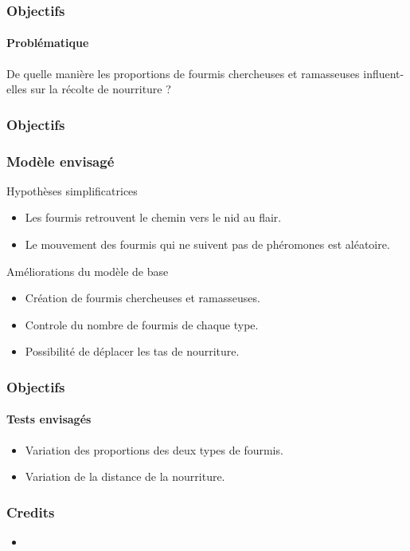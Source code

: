 \documentclass[11pt]{beamer}
\begin{document}
\begin{frame}
\frametitle{Objectifs}
\framesubtitle{Problématique}
\begin{center} De quelle manière les proportions de fourmis chercheuses et ramasseuses influent-elles sur la récolte de nourriture ?
\end{center}
\end{frame}

\begin{frame}

\frametitle{Objectifs}
\frametitle{Modèle envisagé}
\begin{block}{Hypothèses simplificatrices}
\begin{itemize}
\item Les fourmis retrouvent le chemin vers le nid au flair.
\item Le mouvement des fourmis qui ne suivent pas de phéromones est aléatoire.
\end{itemize}
\end{block}
\begin{block}{Améliorations du modèle de base}
\begin{itemize}
\item Création de fourmis chercheuses et ramasseuses.
\item Controle du nombre de fourmis de chaque type.
\item Possibilité de déplacer les tas de nourriture.
\end{itemize}
\end{block}
\end{frame}

\begin{frame}
\frametitle{Objectifs}
\framesubtitle{Tests envisagés}
\begin{itemize}
\item Variation des proportions des deux types de fourmis.
\item Variation de la distance de la nourriture.

\end{itemize}
\end{frame}

\begin{frame}
\frametitle{Credits}
\begin{itemize}
\item 
\end{itemize}
\end{frame}
\end{document}
